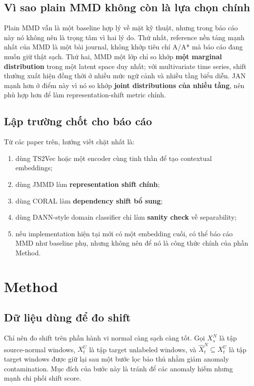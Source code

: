 \documentclass[a4paper]{article}
\begin{document}
\subsection{Vì sao plain MMD không còn là lựa chọn chính}

Plain MMD vẫn là một baseline hợp lý về mặt kỹ thuật, nhưng trong báo cáo này nó không nên là trọng tâm vì hai lý do. Thứ nhất, reference nền tảng mạnh nhất của MMD là một bài journal, không khớp tiêu chí A/A* mà báo cáo đang muốn giữ thật sạch. Thứ hai, MMD một lớp chỉ so khớp \textbf{một marginal distribution} trong một latent space duy nhất; với multivariate time series, shift thường xuất hiện đồng thời ở nhiều mức ngữ cảnh và nhiều tầng biểu diễn. JAN \cite{jan} mạnh hơn ở điểm này vì nó so khớp \textbf{joint distributions của nhiều tầng}, nên phù hợp hơn để làm representation-shift metric chính.

\subsection{Lập trường chốt cho báo cáo}

Từ các paper trên, hướng viết chặt nhất là:
\begin{enumerate}[label=\arabic*.]
    \item dùng TS2Vec hoặc một encoder cùng tinh thần để tạo contextual embeddings;
    \item dùng JMMD làm \textbf{representation shift chính};
    \item dùng CORAL làm \textbf{dependency shift bổ sung};
    \item dùng DANN-style domain classifier chỉ làm \textbf{sanity check} về separability;
    \item nếu implementation hiện tại mới có một embedding cuối, có thể báo cáo MMD như baseline phụ, nhưng không nên để nó là công thức chính của phần Method.
\end{enumerate}

\section{Method}

\subsection{Dữ liệu dùng để đo shift}

Chỉ nên đo shift trên phần hành vi normal càng sạch càng tốt. Gọi \(X_s^N\) là tập source-normal windows, \(X_t^U\) là tập target unlabeled windows, và \(\widehat{X}_t^N \subseteq X_t^U\) là tập target windows được giữ lại sau một bước lọc bảo thủ nhằm giảm anomaly contamination. Mục đích của bước này là tránh để các anomaly hiếm nhưng mạnh chi phối shift score.
\end{document}
